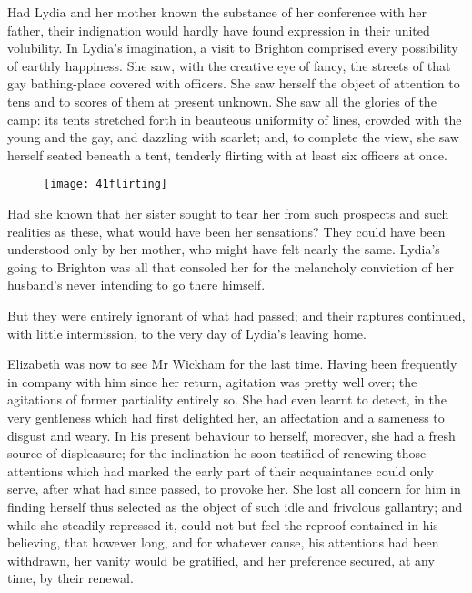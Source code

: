 Had Lydia and her mother known the substance of her conference with her father, their indignation would hardly have found expression in their united volubility. In Lydia's imagination, a visit to Brighton comprised every possibility of earthly happiness. She saw, with the creative eye of fancy, the streets of that gay bathing-place covered with officers. She saw herself the object of attention to tens and to scores of them at present unknown. She saw all the glories of the camp: its tents stretched forth in beauteous uniformity of lines, crowded with the young and the gay, and dazzling with scarlet; and, to complete the view, she saw herself seated beneath a tent, tenderly flirting with at least six officers at once.

\begin{figure}[tbh]
\centering
\texttt{[image: 41flirting]}
\end{figure}

Had she known that her sister sought to tear her from such prospects and such realities as these, what would have been her sensations? They could have been understood only by her mother, who might have felt nearly the same. Lydia's going to Brighton was all that consoled her for the melancholy conviction of her husband's never intending to go there himself.

But they were entirely ignorant of what had passed; and their raptures continued, with little intermission, to the very day of Lydia's leaving home.

Elizabeth was now to see Mr Wickham for the last time. Having been frequently in company with him since her return, agitation was pretty well over; the agitations of former partiality entirely so. She had even learnt to detect, in the very gentleness which had first delighted her, an affectation and a sameness to disgust and weary. In his present behaviour to herself, moreover, she had a fresh source of displeasure; for the inclination he soon testified of renewing those attentions which had marked the early part of their acquaintance could only serve, after what had since passed, to provoke her. She lost all concern for him in finding herself thus selected as the object of such idle and frivolous gallantry; and while she steadily repressed it, could not but feel the reproof contained in his believing, that however long, and for whatever cause, his attentions had been withdrawn, her vanity would be gratified, and her preference secured, at any time, by their renewal.

